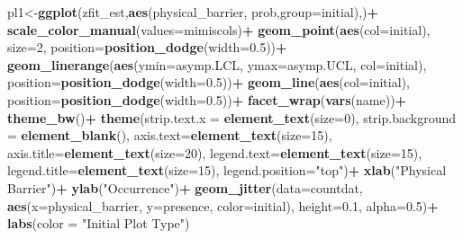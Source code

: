 \documentclass[
]{article}
\newenvironment{Shaded}{\begin{snugshade}}{\end{snugshade}}
\newcommand{\AttributeTok}[1]{\textcolor[rgb]{0.13,0.29,0.53}{#1}}
\newcommand{\DecValTok}[1]{\textcolor[rgb]{0.00,0.00,0.81}{#1}}
\newcommand{\FloatTok}[1]{\textcolor[rgb]{0.00,0.00,0.81}{#1}}
\newcommand{\FunctionTok}[1]{\textcolor[rgb]{0.13,0.29,0.53}{\textbf{#1}}}
\newcommand{\NormalTok}[1]{#1}
\newcommand{\OtherTok}[1]{\textcolor[rgb]{0.56,0.35,0.01}{#1}}
\newcommand{\SpecialCharTok}[1]{\textcolor[rgb]{0.81,0.36,0.00}{\textbf{#1}}}
\newcommand{\StringTok}[1]{\textcolor[rgb]{0.31,0.60,0.02}{#1}}
\begin{document}
\begin{Shaded}
\begin{Highlighting}[]
\NormalTok{pl1}\OtherTok{\textless{}{-}}\FunctionTok{ggplot}\NormalTok{(zfit\_est,}\FunctionTok{aes}\NormalTok{(physical\_barrier, prob,}\AttributeTok{group=}\NormalTok{initial),)}\SpecialCharTok{+}
  \FunctionTok{scale\_color\_manual}\NormalTok{(}\AttributeTok{values=}\NormalTok{mimiscols)}\SpecialCharTok{+}
  \FunctionTok{geom\_point}\NormalTok{(}\FunctionTok{aes}\NormalTok{(}\AttributeTok{col=}\NormalTok{initial), }\AttributeTok{size=}\DecValTok{2}\NormalTok{, }\AttributeTok{position=}\FunctionTok{position\_dodge}\NormalTok{(}\AttributeTok{width=}\FloatTok{0.5}\NormalTok{))}\SpecialCharTok{+}
  \FunctionTok{geom\_linerange}\NormalTok{(}\FunctionTok{aes}\NormalTok{(}\AttributeTok{ymin=}\NormalTok{asymp.LCL, }\AttributeTok{ymax=}\NormalTok{asymp.UCL, }\AttributeTok{col=}\NormalTok{initial), }\AttributeTok{position=}\FunctionTok{position\_dodge}\NormalTok{(}\AttributeTok{width=}\FloatTok{0.5}\NormalTok{))}\SpecialCharTok{+}
  \FunctionTok{geom\_line}\NormalTok{(}\FunctionTok{aes}\NormalTok{(}\AttributeTok{col=}\NormalTok{initial), }\AttributeTok{position=}\FunctionTok{position\_dodge}\NormalTok{(}\AttributeTok{width=}\FloatTok{0.5}\NormalTok{))}\SpecialCharTok{+}
  \FunctionTok{facet\_wrap}\NormalTok{(}\FunctionTok{vars}\NormalTok{(name))}\SpecialCharTok{+}
  \FunctionTok{theme\_bw}\NormalTok{()}\SpecialCharTok{+}
  \FunctionTok{theme}\NormalTok{(}\AttributeTok{strip.text.x =} \FunctionTok{element\_text}\NormalTok{(}\AttributeTok{size=}\DecValTok{0}\NormalTok{),}
        \AttributeTok{strip.background =} \FunctionTok{element\_blank}\NormalTok{(),}
        \AttributeTok{axis.text=}\FunctionTok{element\_text}\NormalTok{(}\AttributeTok{size=}\DecValTok{15}\NormalTok{),}
        \AttributeTok{axis.title=}\FunctionTok{element\_text}\NormalTok{(}\AttributeTok{size=}\DecValTok{20}\NormalTok{),}
        \AttributeTok{legend.text=}\FunctionTok{element\_text}\NormalTok{(}\AttributeTok{size=}\DecValTok{15}\NormalTok{),}
        \AttributeTok{legend.title=}\FunctionTok{element\_text}\NormalTok{(}\AttributeTok{size=}\DecValTok{15}\NormalTok{),}
        \AttributeTok{legend.position=}\StringTok{"top"}\NormalTok{)}\SpecialCharTok{+}
  \FunctionTok{xlab}\NormalTok{(}\StringTok{"Physical Barrier"}\NormalTok{)}\SpecialCharTok{+}
  \FunctionTok{ylab}\NormalTok{(}\StringTok{"Occurrence"}\NormalTok{)}\SpecialCharTok{+}
  \FunctionTok{geom\_jitter}\NormalTok{(}\AttributeTok{data=}\NormalTok{countdat,}
             \FunctionTok{aes}\NormalTok{(}\AttributeTok{x=}\NormalTok{physical\_barrier, }\AttributeTok{y=}\NormalTok{presence, }\AttributeTok{color=}\NormalTok{initial), }
             \AttributeTok{height=}\FloatTok{0.1}\NormalTok{,}
             \AttributeTok{alpha=}\FloatTok{0.5}\NormalTok{)}\SpecialCharTok{+}
  \FunctionTok{labs}\NormalTok{(}\AttributeTok{color =} \StringTok{"Initial Plot Type"}\NormalTok{)}
  

\end{Highlighting}
\end{Shaded}
\end{document}
